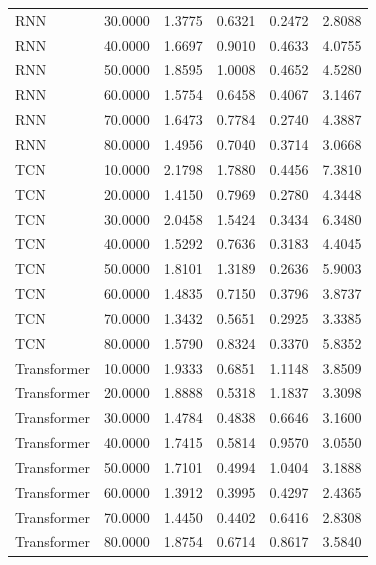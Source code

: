 \begin{tabular}{lrrrrr}
RNN & 30.0000 & 1.3775 & 0.6321 & 0.2472 & 2.8088 \\
RNN & 40.0000 & 1.6697 & 0.9010 & 0.4633 & 4.0755 \\
RNN & 50.0000 & 1.8595 & 1.0008 & 0.4652 & 4.5280 \\
RNN & 60.0000 & 1.5754 & 0.6458 & 0.4067 & 3.1467 \\
RNN & 70.0000 & 1.6473 & 0.7784 & 0.2740 & 4.3887 \\
RNN & 80.0000 & 1.4956 & 0.7040 & 0.3714 & 3.0668 \\
TCN & 10.0000 & 2.1798 & 1.7880 & 0.4456 & 7.3810 \\
TCN & 20.0000 & 1.4150 & 0.7969 & 0.2780 & 4.3448 \\
TCN & 30.0000 & 2.0458 & 1.5424 & 0.3434 & 6.3480 \\
TCN & 40.0000 & 1.5292 & 0.7636 & 0.3183 & 4.4045 \\
TCN & 50.0000 & 1.8101 & 1.3189 & 0.2636 & 5.9003 \\
TCN & 60.0000 & 1.4835 & 0.7150 & 0.3796 & 3.8737 \\
TCN & 70.0000 & 1.3432 & 0.5651 & 0.2925 & 3.3385 \\
TCN & 80.0000 & 1.5790 & 0.8324 & 0.3370 & 5.8352 \\
Transformer & 10.0000 & 1.9333 & 0.6851 & 1.1148 & 3.8509 \\
Transformer & 20.0000 & 1.8888 & 0.5318 & 1.1837 & 3.3098 \\
Transformer & 30.0000 & 1.4784 & 0.4838 & 0.6646 & 3.1600 \\
Transformer & 40.0000 & 1.7415 & 0.5814 & 0.9570 & 3.0550 \\
Transformer & 50.0000 & 1.7101 & 0.4994 & 1.0404 & 3.1888 \\
Transformer & 60.0000 & 1.3912 & 0.3995 & 0.4297 & 2.4365 \\
Transformer & 70.0000 & 1.4450 & 0.4402 & 0.6416 & 2.8308 \\
Transformer & 80.0000 & 1.8754 & 0.6714 & 0.8617 & 3.5840 \\
\bottomrule
\end{tabular}
